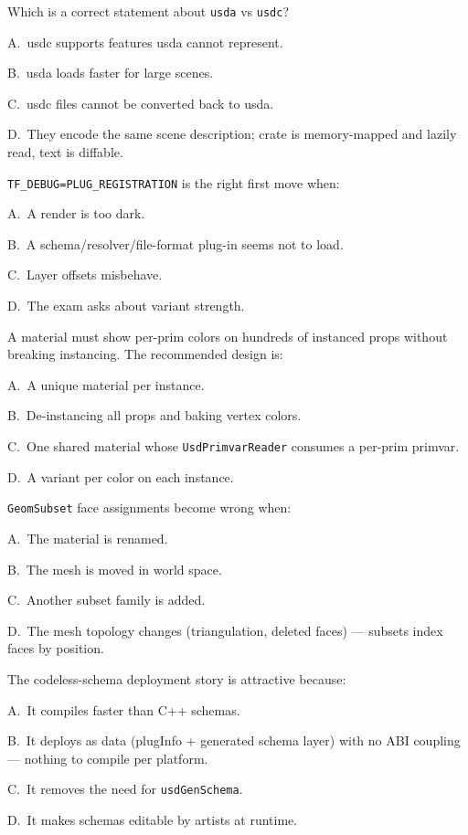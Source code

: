 Which is a correct statement about \texttt{usda} vs \texttt{usdc}?
\begin{Choices}
  \item A.\ usdc supports features usda cannot represent.
  \item B.\ usda loads faster for large scenes.
  \item C.\ usdc files cannot be converted back to usda.
  \item D.\ They encode the same scene description; crate is memory-mapped and lazily read, text is diffable.
\end{Choices}

\texttt{TF\_DEBUG=PLUG\_REGISTRATION} is the right first move when:
\begin{Choices}
  \item A.\ A render is too dark.
  \item B.\ A schema/resolver/file-format plug-in seems not to load.
  \item C.\ Layer offsets misbehave.
  \item D.\ The exam asks about variant strength.
\end{Choices}

A material must show per-prim colors on hundreds of instanced props without
breaking instancing. The recommended design is:
\begin{Choices}
  \item A.\ A unique material per instance.
  \item B.\ De-instancing all props and baking vertex colors.
  \item C.\ One shared material whose \texttt{UsdPrimvarReader} consumes a per-prim primvar.
  \item D.\ A variant per color on each instance.
\end{Choices}

\texttt{GeomSubset} face assignments become wrong when:
\begin{Choices}
  \item A.\ The material is renamed.
  \item B.\ The mesh is moved in world space.
  \item C.\ Another subset family is added.
  \item D.\ The mesh topology changes (triangulation, deleted faces) --- subsets index faces by position.
\end{Choices}

The codeless-schema deployment story is attractive because:
\begin{Choices}
  \item A.\ It compiles faster than C++ schemas.
  \item B.\ It deploys as data (plugInfo + generated schema layer) with no ABI coupling --- nothing to compile per platform.
  \item C.\ It removes the need for \texttt{usdGenSchema}.
  \item D.\ It makes schemas editable by artists at runtime.
\end{Choices}

